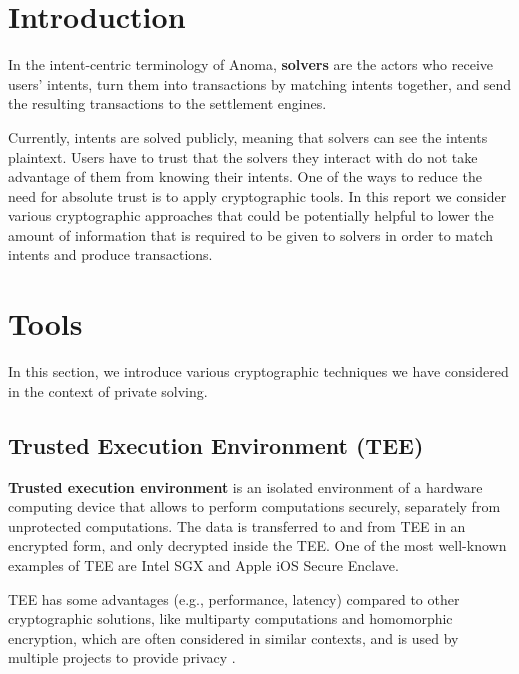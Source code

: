 \documentclass[
    9pt,            %
    report,        %
    affiltop,       %
]{art}
\begin{document}
\maketitle

\section{Introduction}

In the intent-centric terminology of Anoma, \textbf{solvers} are the actors who receive users' intents, turn them into transactions by matching intents together, and send the resulting transactions to the settlement engines. 

Currently, intents are solved publicly, meaning that solvers can see the intents plaintext. Users have to trust that the solvers they interact with do not take advantage of them from knowing their intents. One of the ways to reduce the need for absolute trust is to apply cryptographic tools. In this report we consider various cryptographic approaches that could be potentially helpful to lower the amount of information that is required to be given to solvers in order to match intents and produce transactions.

\section{Tools}

In this section, we introduce various cryptographic techniques we have considered in the context of private solving. 

\subsection{Trusted Execution Environment (TEE)}

\textbf{Trusted execution environment} is an isolated environment of a hardware computing device that allows to perform computations securely, separately from unprotected computations. The data is transferred to and from TEE in an encrypted form, and only decrypted inside the TEE. One of the most well-known examples of TEE are Intel SGX and Apple iOS Secure Enclave. 

TEE has some advantages (e.g., performance, latency) compared to other cryptographic solutions, like multiparty computations and homomorphic encryption, which are often considered in similar contexts, and is used by multiple projects to provide privacy \cite{flash} \cite{secret}.
\end{document}
